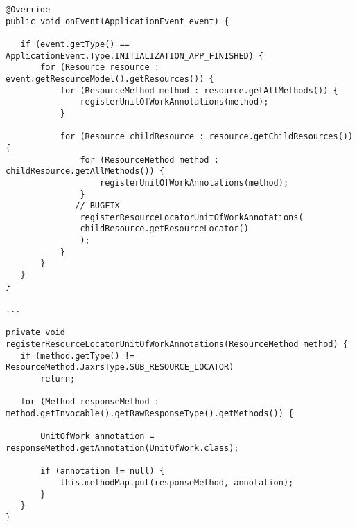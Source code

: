 \documentclass[11pt]{article}
\begin{document}
\begin{verbatim}
@Override
public void onEvent(ApplicationEvent event) {

   if (event.getType() == ApplicationEvent.Type.INITIALIZATION_APP_FINISHED) {
       for (Resource resource : event.getResourceModel().getResources()) {
           for (ResourceMethod method : resource.getAllMethods()) {
               registerUnitOfWorkAnnotations(method);
           }

           for (Resource childResource : resource.getChildResources()) {
               for (ResourceMethod method : childResource.getAllMethods()) {
                   registerUnitOfWorkAnnotations(method);
               }
              // BUGFIX
               registerResourceLocatorUnitOfWorkAnnotations(
               childResource.getResourceLocator()
               );
           }
       }
   }
}

...

private void registerResourceLocatorUnitOfWorkAnnotations(ResourceMethod method) {
   if (method.getType() != ResourceMethod.JaxrsType.SUB_RESOURCE_LOCATOR)
       return;

   for (Method responseMethod : method.getInvocable().getRawResponseType().getMethods()) {

       UnitOfWork annotation = responseMethod.getAnnotation(UnitOfWork.class);

       if (annotation != null) {
           this.methodMap.put(responseMethod, annotation);
       }
   }
}
\end{verbatim}
\end{document}
